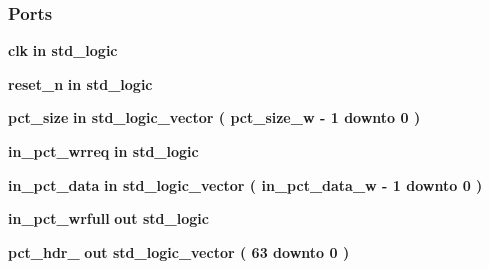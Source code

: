 \subsubsection*{Ports}
 \begin{DoxyCompactItemize}
\item 
{\bf clk}  {\bfseries {\bfseries \textcolor{keywordflow}{in}\textcolor{vhdlchar}{ }}} {\bfseries \textcolor{comment}{std\+\_\+logic}\textcolor{vhdlchar}{ }} 
\item 
{\bf reset\+\_\+n}  {\bfseries {\bfseries \textcolor{keywordflow}{in}\textcolor{vhdlchar}{ }}} {\bfseries \textcolor{comment}{std\+\_\+logic}\textcolor{vhdlchar}{ }} 
\item 
{\bf pct\+\_\+size}  {\bfseries {\bfseries \textcolor{keywordflow}{in}\textcolor{vhdlchar}{ }}} {\bfseries \textcolor{comment}{std\+\_\+logic\+\_\+vector}\textcolor{vhdlchar}{ }\textcolor{vhdlchar}{(}\textcolor{vhdlchar}{ }\textcolor{vhdlchar}{ }\textcolor{vhdlchar}{ }\textcolor{vhdlchar}{ }{\bfseries {\bf pct\+\_\+size\+\_\+w}} \textcolor{vhdlchar}{-\/}\textcolor{vhdlchar}{ } \textcolor{vhdldigit}{1} \textcolor{vhdlchar}{ }\textcolor{keywordflow}{downto}\textcolor{vhdlchar}{ }\textcolor{vhdlchar}{ } \textcolor{vhdldigit}{0} \textcolor{vhdlchar}{ }\textcolor{vhdlchar}{)}\textcolor{vhdlchar}{ }} 
\item 
{\bf in\+\_\+pct\+\_\+wrreq}  {\bfseries {\bfseries \textcolor{keywordflow}{in}\textcolor{vhdlchar}{ }}} {\bfseries \textcolor{comment}{std\+\_\+logic}\textcolor{vhdlchar}{ }} 
\item 
{\bf in\+\_\+pct\+\_\+data}  {\bfseries {\bfseries \textcolor{keywordflow}{in}\textcolor{vhdlchar}{ }}} {\bfseries \textcolor{comment}{std\+\_\+logic\+\_\+vector}\textcolor{vhdlchar}{ }\textcolor{vhdlchar}{(}\textcolor{vhdlchar}{ }\textcolor{vhdlchar}{ }\textcolor{vhdlchar}{ }\textcolor{vhdlchar}{ }{\bfseries {\bf in\+\_\+pct\+\_\+data\+\_\+w}} \textcolor{vhdlchar}{-\/}\textcolor{vhdlchar}{ } \textcolor{vhdldigit}{1} \textcolor{vhdlchar}{ }\textcolor{keywordflow}{downto}\textcolor{vhdlchar}{ }\textcolor{vhdlchar}{ } \textcolor{vhdldigit}{0} \textcolor{vhdlchar}{ }\textcolor{vhdlchar}{)}\textcolor{vhdlchar}{ }} 
\item 
{\bf in\+\_\+pct\+\_\+wrfull}  {\bfseries {\bfseries \textcolor{keywordflow}{out}\textcolor{vhdlchar}{ }}} {\bfseries \textcolor{comment}{std\+\_\+logic}\textcolor{vhdlchar}{ }} 
\item 
{\bf pct\+\_\+hdr\+\_}  {\bfseries {\bfseries \textcolor{keywordflow}{out}\textcolor{vhdlchar}{ }}} {\bfseries \textcolor{comment}{std\+\_\+logic\+\_\+vector}\textcolor{vhdlchar}{ }\textcolor{vhdlchar}{(}\textcolor{vhdlchar}{ }\textcolor{vhdlchar}{ } \textcolor{vhdldigit}{63} \textcolor{vhdlchar}{ }\textcolor{keywordflow}{downto}\textcolor{vhdlchar}{ }\textcolor{vhdlchar}{ } \textcolor{vhdldigit}{0} \textcolor{vhdlchar}{ }\textcolor{vhdlchar}{)}\textcolor{vhdlchar}{ }} 

\end{DoxyCompactItemize}
